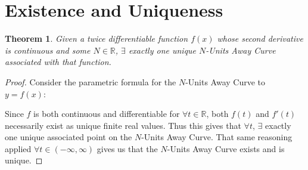 \newtheorem{myTrm}{Theorem}

\section{Existence and Uniqueness}

\begin{myTrm}
    Given a twice differentiable function $f(x)$ whose second derivative is continuous and some $N \in \mathbb{R}$, $\exists$ exactly one unique $N$-Units Away Curve associated with that function.
\end{myTrm}


\begin{proof}
Consider the parametric formula for the $N$-Units Away Curve to $y=f(x)$: \firstFormula

Since $f$ is both continuous and differentiable for $\forall t \in \mathbb{R}$, both $f(t)$ and $f'(t)$ necessarily exist as unique finite real values. Thus this gives that $\forall t$, $\exists$ exactly
one unique associated point on the $N$-Units Away Curve. That same reasoning applied $\forall t \in (- \infty, \infty)$ gives us that the $N$-Units Away Curve exists and is unique.

\end{proof}